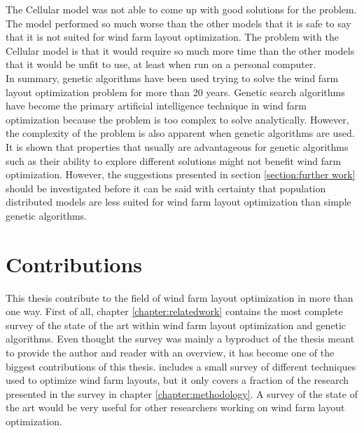 \noindent The Cellular model was not able to come up with good solutions for the problem. The model performed so much worse than the other models that it is safe to say that it is not suited for wind farm layout optimization. The problem with the Cellular model is that it would require so much more time than the other models that it would be unfit to use, at least when run on a personal computer.\\

\noindent In summary, genetic algorithms have been used trying to solve the wind farm layout optimization problem for more than 20 years. Genetic search algorithms have become the primary artificial intelligence technique in wind farm optimization because the problem is too complex to solve analytically. However, the complexity of the problem is also apparent when genetic algorithms are used. It is shown that properties that usually are advantageous for genetic algorithms such as  their ability to explore different solutions might not benefit wind farm optimization. However, the suggestions presented in section \ref{section:further work} should be investigated before it can be said with certainty that population distributed models are less suited for wind farm layout optimization than simple genetic algorithms.\\


\section{Contributions}\label{section:contributions}
This thesis contribute to the field of wind farm layout optimization in more than one way. First of all, chapter \ref{chapter:relatedwork} contains the most complete survey of the state of the art within wind farm layout optimization and genetic algorithms. Even thought the survey was mainly a byproduct of the thesis meant to provide the author and reader with an overview, it has become one of the biggest contributions of this thesis. \cite{Samorani} includes a small survey of different techniques used to optimize wind farm layouts, but it only covers a fraction of the research presented in the survey in chapter \ref{chapter:methodology}. A survey of the state of the art would be very useful for other researchers working on wind farm layout optimization.\\

